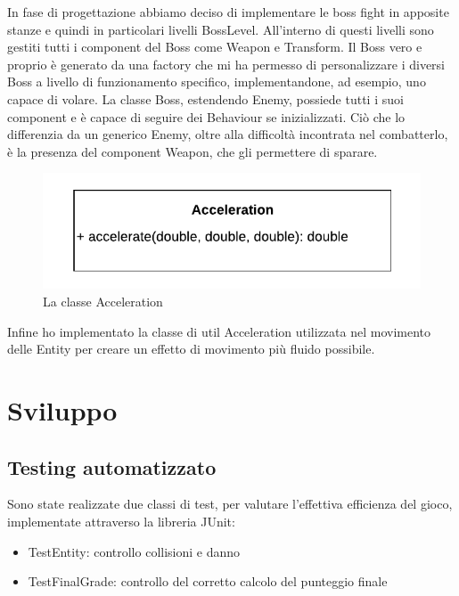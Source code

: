 \documentclass[a4paper,12pt]{report}
\begin{document}
In fase di progettazione abbiamo deciso di implementare le boss fight in apposite stanze e quindi in particolari livelli BossLevel. All’interno di questi livelli sono gestiti tutti i component del Boss come Weapon e Transform.
Il Boss vero e proprio è generato da una factory che mi ha permesso di personalizzare i diversi Boss a livello di funzionamento specifico, implementandone, ad esempio, uno capace di volare.
La classe Boss, estendendo Enemy, possiede tutti i suoi component e è capace di seguire dei Behaviour se inizializzati. Ciò che lo differenzia da un generico Enemy, oltre alla difficoltà incontrata nel combatterlo, è la presenza del component Weapon, che gli permettere di sparare.
\begin{figure}[ht]
\includegraphics[width=1\textwidth]{UMLAcceleration.png}
\caption{La classe Acceleration}
\label{fig:schgen}
\end{figure}
Infine ho implementato la classe di util Acceleration utilizzata nel movimento delle Entity per creare un effetto di movimento più fluido possibile.
\chapter{Sviluppo}
\section{Testing automatizzato}
Sono state realizzate due classi di test, per valutare l'effettiva efficienza del gioco, implementate attraverso la libreria JUnit:
\begin{itemize}
\item TestEntity: controllo collisioni e danno
\item TestFinalGrade: controllo del corretto calcolo del punteggio finale
\end{itemize}
\end{document}
